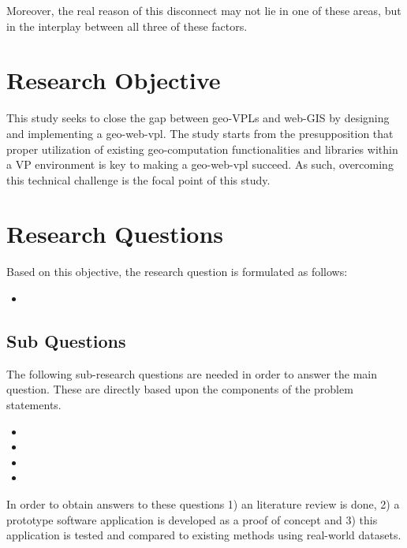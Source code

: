 Moreover, the real reason of this disconnect may not lie in one of these areas, but in the interplay between all three of these factors. 

\newpage
\section{Research Objective}
This study seeks to close the gap between geo-VPLs and web-GIS by designing and implementing a geo-web-vpl.
The study starts from the presupposition that proper utilization of existing geo-computation functionalities and libraries within a VP environment is key to making a geo-web-vpl succeed. 
As such, overcoming this technical challenge is the focal point of this study. 

\section{Research Questions}
Based on this objective, the research question is formulated as follows: 
\begin{itemize}[ ]
  \item \myMainRQ
\end{itemize}

\subsection*{Sub Questions}
The following sub-research questions are needed in order to answer the main question.
These are directly based upon the components of the problem statements. 
\begin{itemize}[-]
  \item \mySubRQOne
  \item \mySubRQTwo
  \item \mySubRQThree
  \item \mySubRQFour
\end{itemize}
In order to obtain answers to these questions 
1) an literature review is done, 
2) a prototype software application is developed as a proof of concept and 
3) this application is tested and compared to existing methods using real-world datasets.



